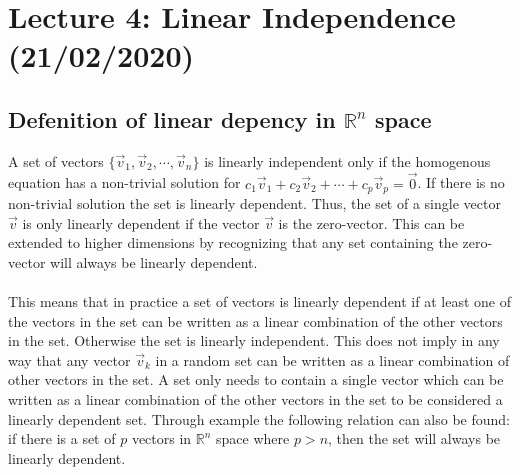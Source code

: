 \documentclass[11pt, a4paper]{article}
\begin{document}
\setcounter{section}{3}
\section{Lecture 4: Linear Independence (21/02/2020)}
\subsection{Defenition of linear depency in $\mathbb{R}^n$ space}
A set of vectors $\{ \vec{v}_1 , \vec{v}_2, \cdots, \vec{v}_n \}$ is linearly independent only
if the homogenous equation has a non-trivial solution for $c_1\vec{v}_1 + c_2\vec{v}_2 + \cdots + c_p\vec{v}_p = \vec{0}$.
If there is no non-trivial solution the set is linearly dependent. Thus, the set of a single vector
$\vec{v}$ is only linearly dependent if the vector $\vec{v}$ is the zero-vector. This can be extended
to higher dimensions by recognizing that any set containing the zero-vector will always be linearly dependent.\\
\\
This means that in practice a set of vectors is linearly dependent if at least one of the vectors
in the set can be written as a linear combination of the other vectors in the set. Otherwise the set is linearly independent.
This does not imply in any way that any vector $\vec{v}_k$ in a random set can be written as a linear combination
of other vectors in the set. A set only needs to contain a single vector which can be written as a linear combination
of the other vectors in the set to be considered a linearly dependent set.
Through example the following relation can also be found: if there is a set of $p$ vectors in $\mathbb{R}^n$ space
where $p > n$, then the set will always be linearly dependent.
\end{document}
